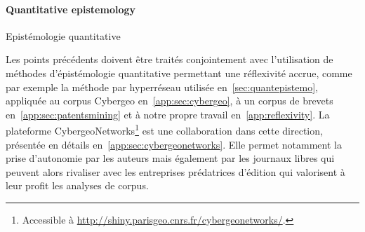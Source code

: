 
%


\paragraph{Quantitative epistemology}{Epistémologie quantitative}

%

Les points précédents doivent être traités conjointement avec l'utilisation de méthodes d'épistémologie quantitative permettant une réflexivité accrue, comme par exemple la méthode par hyperréseau utilisée en~\ref{sec:quantepistemo}, appliquée au corpus Cybergeo en~\ref{app:sec:cybergeo}, à un corpus de brevets en~\ref{app:sec:patentsmining} et à notre propre travail en~\ref{app:reflexivity}. La plateforme CybergeoNetworks\footnote{Accessible à \url{http://shiny.parisgeo.cnrs.fr/cybergeonetworks/}.} est une collaboration dans cette direction, présentée en détails en~\ref{app:sec:cybergeonetworks}. Elle permet notamment la prise d'autonomie par les auteurs mais également par les journaux libres qui peuvent alors rivaliser avec les entreprises prédatrices d'édition qui valorisent à leur profit les analyses de corpus.




